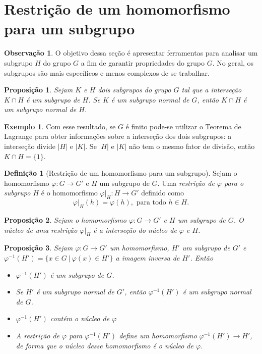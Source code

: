 \documentclass[a4paper,12pt]{report}
\theoremstyle{plain}
\newtheorem{proposicao}{Proposição}[section]
\theoremstyle{definition}
\newtheorem{definicao}{Definição}[section]
\newtheorem{observacao}{Observação}[section]
\newtheorem{exemplo}{Exemplo}[section]
\begin{document}
\section{Restrição de um homomorfismo para um subgrupo}

\begin{observacao}
	O objetivo dessa seção é apresentar ferramentas para analisar um subgrupo \(H\)
	do grupo \(G\) a fim de garantir propriedades do grupo \(G\). No geral,
	os subgrupos são mais específicos e menos complexos de se trabalhar.
\end{observacao}

\begin{proposicao}
	Sejam \(K\) e \(H\) dois subgrupos do grupo \(G\)
	tal que a interseção \(K\cap H\) é um subgrupo de \(H\). Se \(K\) é um
	subgrupo normal de \(G\), então \(K\cap H\) é um subgrupo normal de
	\(H\).	
\end{proposicao}

\begin{exemplo}
	Com esse resultado, se \(G\) é finito pode-se utilizar o
	Teorema de Lagrange para obter informações sobre a interseção dos dois
	subgrupos: a interseção divide \(|H|\) e \(|K|\). Se \(|H|\) e \(|K|\)
	não tem o mesmo fator de divisão, então \(K\cap H = \{1\}\).	
\end{exemplo}

\begin{definicao}[Restrição de um homomorfismo para um subgrupo]
	Sejam o homomorfismo \(\varphi:G\longrightarrow G'\)
	e \(H\) um subgrupo de \(G\). Uma \emph{restrição de \(\varphi\) para o subgrupo \(H\)} é o homomorfismo \(\varphi|_H:H\longrightarrow G'\)
	definido como
	\[\varphi|_H(h) = \varphi(h), \text{ para todo }h\in H.\]	
\end{definicao}

\begin{proposicao}
	Sejam o homomorfismo
	\(\varphi:G\longrightarrow G'\) e \(H\) um subgrupo de \(G\). O núcleo
	de uma restrição \(\varphi|_H\) é a interseção do núcleo de \(\varphi\)
	e \(H\).	
\end{proposicao}

\begin{proposicao}
	 Sejam \(\varphi:G\longrightarrow G'\) um
	homomorfismo, \(H'\) um subgrupo de \(G'\) e
	\(\varphi^{-1}(H') = \{x \in G \ | \ \varphi(x) \in H'\}\) a imagem
	inversa de \(H'\). Então
	\begin{itemize}
		\item \(\varphi^{-1}(H')\) é um subgrupo de \(G\).
		\item Se \(H'\) é um subgrupo normal de \(G'\), então \(\varphi^{-1}(H')\) é
		um subgrupo normal de \(G\).
		\item \(\varphi^{-1}(H')\) contém o núcleo de \(\varphi\)
		\item A restrição de \(\varphi\) para \(\varphi^{-1}(H')\) define um
		homomorfismo \(\varphi^{-1}(H')\longrightarrow H'\), de forma que o
		núcleo desse homomorfismo é o núcleo de \(\varphi\).
	\end{itemize}
\end{proposicao}
\end{document}
